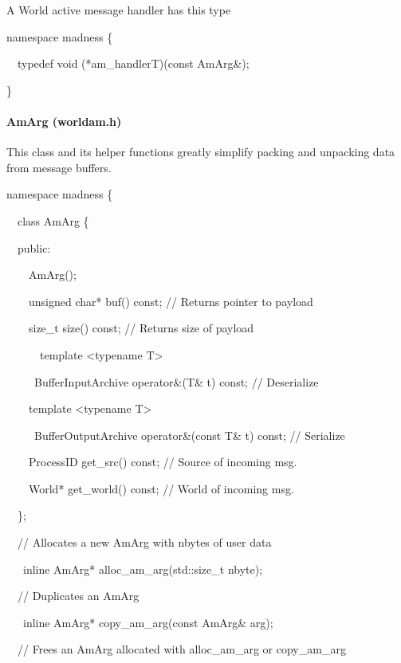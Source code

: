 \documentclass[letterpaper]{article}
\begin{document}
A World active message handler has this type

{\ttfamily
namespace madness \{}

{\ttfamily
\ \ typedef void (*am\_handlerT)(const AmArg\&);}

{\ttfamily
\}}

\paragraph{AmArg (worldam.h)}
This class and its helper functions greatly simplify packing and unpacking data from message buffers.


\bigskip

{\ttfamily
namespace madness \{}

{\ttfamily
\ \ class AmArg \{}

{\ttfamily
\ \ public:}

{\ttfamily
\ \ \ \ AmArg();}

{\ttfamily
\ \ \ \ unsigned char* buf() const; // Returns pointer to payload}

{\ttfamily
\ \ \ \ size\_t size() const; // Returns size of payload}

{\ttfamily
\ \ \ \ \ \ template {\textless}typename T{\textgreater} \ }

{\ttfamily
\ \ \ \  \ BufferInputArchive operator\&(T\& t) const; // Deserialize}

{\ttfamily
\ \ \ \ template {\textless}typename T{\textgreater}}

{\ttfamily
\ \ \ \  \ BufferOutputArchive operator\&(const T\& t) const; // Serialize}

{\ttfamily
\ \ \ \ ProcessID get\_src() const; // Source of incoming msg.}

{\ttfamily
\ \ \ \ World* get\_world() const; // World of incoming msg.}

{\ttfamily
\ \ \};}


\bigskip

{\ttfamily
\ \ // Allocates a new AmArg with nbytes of user data}

{\ttfamily
\ \ \ inline AmArg* alloc\_am\_arg(std::size\_t nbyte);}


\bigskip

{\ttfamily
\ \ // Duplicates an AmArg}

{\ttfamily
\ \ \ inline AmArg* copy\_am\_arg(const AmArg\& arg);}


\bigskip

{\ttfamily
\ \ // Frees an AmArg allocated with alloc\_am\_arg or copy\_am\_arg}
\end{document}
